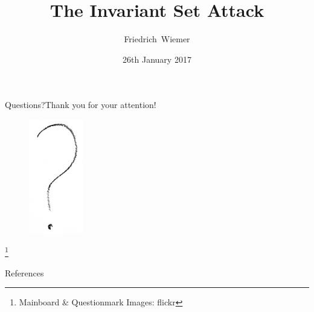\documentclass[12pt,mathserif,professionalfont,aspectratio=43]{beamer}
\title{The Invariant Set Attack}
\subtitle{}
\author[Friedrich~Wiemer]{Friedrich~Wiemer}
\institute{%
    Workgroup Symmetric Cryptography\\
    Ruhr University Bochum
}
\date{26th January 2017}
\newcommand{\blfootnote}[1]{%
    \begingroup
        \renewcommand\thefootnote{}\footnote{#1}%
        \addtocounter{footnote}{-1}%
    \endgroup
}
\begin{document}
\begin{frame}
    \titlepage{}
\end{frame}




\begin{frame}{Questions?}{Thank you for your attention!}
            \begin{figure}[!htb]
                \includegraphics[height=50mm]{data/flickr/questionmark.png}
            \end{figure}
    \blfootnote{\scriptsize Mainboard \& Questionmark Images: flickr}
\end{frame}

\begin{frame}[allowframebreaks]{References}
    \tiny
    \printbibliography{}
\end{frame}
\end{document}
